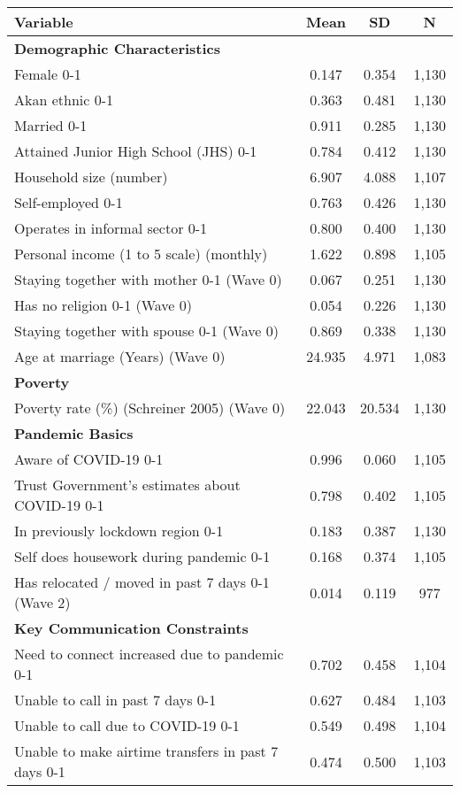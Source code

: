 \begin{tabular}{lccc}
\hline
Variable & Mean & SD & N \\
\hline\hline
\textbf{Demographic Characteristics} & & & \\ 
Female 0-1 & 0.147 & 0.354 & 1,130 \\ 
Akan ethnic 0-1 & 0.363 & 0.481 & 1,130 \\ 
Married 0-1 & 0.911 & 0.285 & 1,130 \\ 
Attained Junior High School (JHS) 0-1 & 0.784 & 0.412 & 1,130 \\ 
Household size (number) & 6.907 & 4.088 & 1,107 \\ 
Self-employed 0-1 & 0.763 & 0.426 & 1,130 \\ 
Operates in informal sector 0-1 & 0.800 & 0.400 & 1,130 \\ 
Personal income (1 to 5 scale) (monthly) & 1.622 & 0.898 & 1,105 \\ 
Staying together with mother 0-1 (Wave 0) & 0.067 & 0.251 & 1,130 \\ 
Has no religion 0-1 (Wave 0) & 0.054 & 0.226 & 1,130 \\ 
Staying together with spouse 0-1 (Wave 0) & 0.869 & 0.338 & 1,130 \\ 
Age at marriage (Years) (Wave 0) & 24.935 & 4.971 & 1,083 \\ 
\textbf{Poverty} & & & \\ 
Poverty rate (\%) (Schreiner 2005) (Wave 0) & 22.043 & 20.534 & 1,130 \\ 
\textbf{Pandemic Basics} & & & \\ 
Aware of COVID-19 0-1 & 0.996 & 0.060 & 1,105 \\ 
Trust Government's estimates about COVID-19 0-1 & 0.798 & 0.402 & 1,105 \\ 
In previously lockdown region 0-1 & 0.183 & 0.387 & 1,130 \\ 
Self does housework during pandemic 0-1 & 0.168 & 0.374 & 1,105 \\ 
Has relocated / moved in past 7 days 0-1 (Wave 2) & 0.014 & 0.119 & 977 \\ 
\textbf{Key Communication Constraints} & & & \\ 
Need to connect increased due to pandemic 0-1 & 0.702 & 0.458 & 1,104 \\ 
Unable to call in past 7 days 0-1 & 0.627 & 0.484 & 1,103 \\ 
Unable to call due to COVID-19 0-1 & 0.549 & 0.498 & 1,104 \\ 
Unable to make airtime transfers in past 7 days 0-1 & 0.474 & 0.500 & 1,103 \\ 

\end{tabular}
